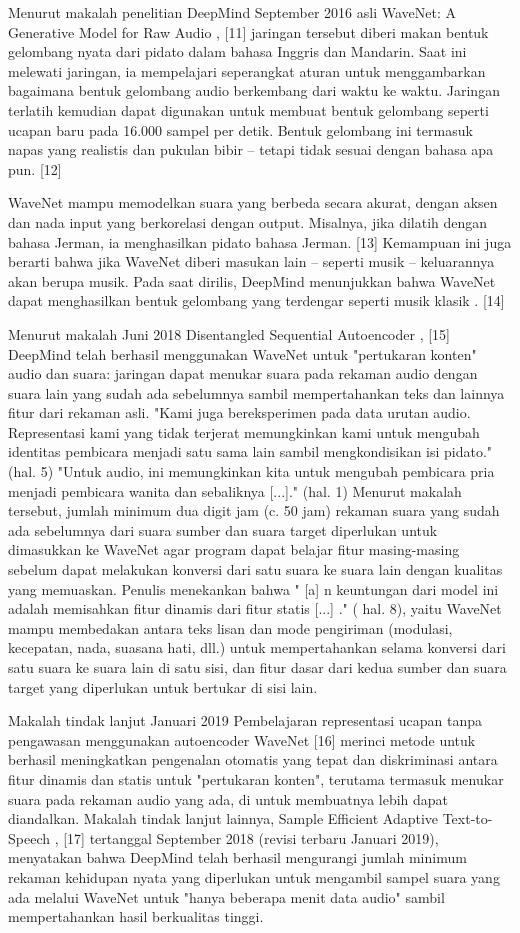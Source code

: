 Menurut makalah penelitian DeepMind September 2016 asli WaveNet: A Generative Model for Raw Audio , [11] jaringan tersebut diberi makan bentuk gelombang nyata dari pidato dalam bahasa Inggris dan Mandarin. Saat ini melewati jaringan, ia mempelajari seperangkat aturan untuk menggambarkan bagaimana bentuk gelombang audio berkembang dari waktu ke waktu. Jaringan terlatih kemudian dapat digunakan untuk membuat bentuk gelombang seperti ucapan baru pada 16.000 sampel per detik. Bentuk gelombang ini termasuk napas yang realistis dan pukulan bibir – tetapi tidak sesuai dengan bahasa apa pun. [12]

WaveNet mampu memodelkan suara yang berbeda secara akurat, dengan aksen dan nada input yang berkorelasi dengan output. Misalnya, jika dilatih dengan bahasa Jerman, ia menghasilkan pidato bahasa Jerman. [13] Kemampuan ini juga berarti bahwa jika WaveNet diberi masukan lain – seperti musik – keluarannya akan berupa musik. Pada saat dirilis, DeepMind menunjukkan bahwa WaveNet dapat menghasilkan bentuk gelombang yang terdengar seperti musik klasik . [14]

Menurut makalah Juni 2018 Disentangled Sequential Autoencoder , [15] DeepMind telah berhasil menggunakan WaveNet untuk "pertukaran konten" audio dan suara: jaringan dapat menukar suara pada rekaman audio dengan suara lain yang sudah ada sebelumnya sambil mempertahankan teks dan lainnya fitur dari rekaman asli. "Kami juga bereksperimen pada data urutan audio. Representasi kami yang tidak terjerat memungkinkan kami untuk mengubah identitas pembicara menjadi satu sama lain sambil mengkondisikan isi pidato." (hal. 5) "Untuk audio, ini memungkinkan kita untuk mengubah pembicara pria menjadi pembicara wanita dan sebaliknya [...]." (hal. 1) Menurut makalah tersebut, jumlah minimum dua digit jam (c. 50 jam) rekaman suara yang sudah ada sebelumnya dari suara sumber dan suara target diperlukan untuk dimasukkan ke WaveNet agar program dapat belajar fitur masing-masing sebelum dapat melakukan konversi dari satu suara ke suara lain dengan kualitas yang memuaskan. Penulis menekankan bahwa " [a] n keuntungan dari model ini adalah memisahkan fitur dinamis dari fitur statis [...] ." ( hal. 8), yaitu WaveNet mampu membedakan antara teks lisan dan mode pengiriman (modulasi, kecepatan, nada, suasana hati, dll.) untuk mempertahankan selama konversi dari satu suara ke suara lain di satu sisi, dan fitur dasar dari kedua sumber dan suara target yang diperlukan untuk bertukar di sisi lain.

Makalah tindak lanjut Januari 2019 Pembelajaran representasi ucapan tanpa pengawasan menggunakan autoencoder WaveNet [16] merinci metode untuk berhasil meningkatkan pengenalan otomatis yang tepat dan diskriminasi antara fitur dinamis dan statis untuk "pertukaran konten", terutama termasuk menukar suara pada rekaman audio yang ada, di untuk membuatnya lebih dapat diandalkan. Makalah tindak lanjut lainnya, Sample Efficient Adaptive Text-to-Speech , [17] tertanggal September 2018 (revisi terbaru Januari 2019), menyatakan bahwa DeepMind telah berhasil mengurangi jumlah minimum rekaman kehidupan nyata yang diperlukan untuk mengambil sampel suara yang ada melalui WaveNet untuk "hanya beberapa menit data audio" sambil mempertahankan hasil berkualitas tinggi.

